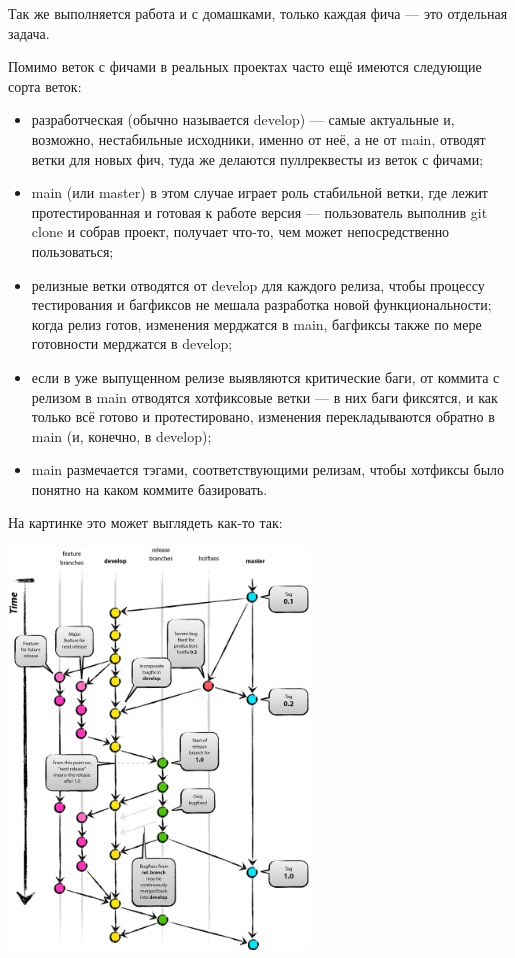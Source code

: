 \documentclass{../text-style}
\begin{document}
Так же выполняется работа и с домашками, только каждая фича --- это отдельная задача.

Помимо веток с фичами в реальных проектах часто ещё имеются следующие сорта веток:

\begin{itemize}
    \item разработческая (обычно называется develop) --- самые актуальные и, возможно, нестабильные исходники, именно от неё, а не от main, отводят ветки для новых фич, туда же делаются пуллреквесты из веток с фичами;
    \item main (или master) в этом случае играет роль стабильной ветки, где лежит протестированная и готовая к работе версия --- пользователь выполнив git clone и собрав проект, получает что-то, чем может непосредственно пользоваться;
    \item релизные ветки отводятся от develop для каждого релиза, чтобы процессу тестирования и багфиксов не мешала разработка новой функциональности; когда релиз готов, изменения мерджатся в main, багфиксы также по мере готовности мерджатся в develop;
    \item если в уже выпущенном релизе выявляются критические баги, от коммита с релизом в main отводятся хотфиксовые ветки --- в них баги фиксятся, и как только всё готово и протестировано, изменения перекладываются обратно в main (и, конечно, в develop);
    \item main размечается тэгами, соответствующими релизам, чтобы хотфиксы было понятно на каком коммите базировать.
\end{itemize}

На картинке это может выглядеть как-то так:

\begin{center}
    \includegraphics[width=0.6\textwidth]{gitFlow.png}
\end{center}
\end{document}
